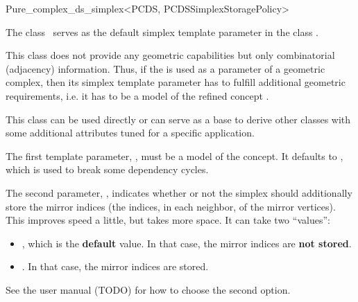 \begin{ccRefClass}{Pure_complex_ds_simplex<PCDS, PCDSSimplexStoragePolicy>}

\ccDefinition

The class \ccRefName\ serves as the default simplex template parameter in the
class .

This class does not provide any geometric capabilities but only combinatorial
(adjacency) information. Thus, if the  is
used as a parameter of a geometric complex, then its simplex template
parameter has to fulfill additional geometric requirements, i.e. it has to be
a model of the refined concept .

This class can be used directly or can serve as a base to derive other classes
with some additional attributes tuned for a specific application.


\ccParameters

The first template parameter, , must be a model of the
 concept. It defaults to , which is
used to break some dependency cycles.

The second parameter, , indicates whether or not
the simplex should additionally store the mirror indices (the indices, in each
neighbor, of the mirror vertices). This improves speed a little, but takes
more space. It can take two ``values'':\begin{itemize}

\item {}, which is the \textbf{default}
value. In that case, the mirror indices are \textbf{not stored}.

\item {}. In that case, the mirror
indices are stored.
\end{itemize}
 See the user manual (TODO) for how to choose the second option.

\ccIsModel


\ccSeeAlso


\end{ccRefClass}

